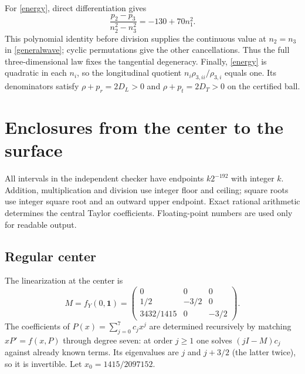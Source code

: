 \documentclass[11pt]{article}
\begin{document}
For \eqref{energy}, direct differentiation gives
\[
 \frac{p_2-p_3}{n_2^2-n_3^2}=-130+70n_1^2.
\]
This polynomial identity before division supplies the continuous value at $n_2=n_3$ in \eqref{generalwave}; cyclic permutations give the other cancellations. Thus the full three-dimensional law fixes the tangential degeneracy. Finally, \eqref{energy} is quadratic in each $n_i$, so the longitudinal quotient $n_i\rho_{3,ii}/\rho_{3,i}$ equals one. Its denominators satisfy $\rho+p_r=2D_L>0$ and $\rho+p_t=2D_T>0$ on the certified ball.

\section{Enclosures from the center to the surface}
All intervals in the independent checker have endpoints $k2^{-192}$ with integer $k$. Addition, multiplication and division use integer floor and ceiling; square roots use integer square root and an outward upper endpoint. Exact rational arithmetic determines the central Taylor coefficients. Floating-point numbers are used only for readable output.

\subsection{Regular center}
The linearization at the center is
\[
 M=f_Y(0,\mathbf1)=\begin{pmatrix}
 0&0&0\\1/2&-3/2&0\\3432/1415&0&-3/2
 \end{pmatrix}.
\]
The coefficients of $P(x)=\sum_{j=0}^7c_jx^j$ are determined recursively by matching $xP'=f(x,P)$ through degree seven: at order $j\geq1$ one solves $(jI-M)c_j$ against already known terms. Its eigenvalues are $j$ and $j+3/2$ (the latter twice), so it is invertible. Let $x_0=1415/2097152$.
\end{document}

